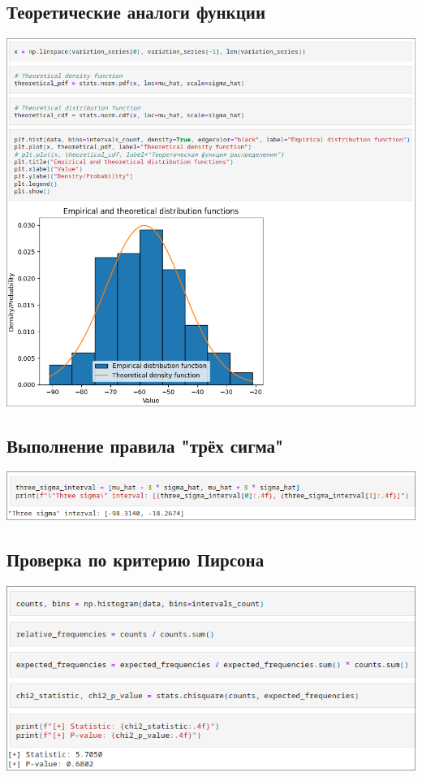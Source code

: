\documentclass[a4paper]{article}
\begin{document}
    \subsection*{Теоретические аналоги функции}
    \includegraphics[width=\textwidth]{images/theoretical_analogs.png}
    
    \subsection*{Выполнение правила "трёх сигма"}
    \includegraphics[width=\textwidth]{images/three_sigma.png}

    \subsection*{Проверка по критерию Пирсона}
    \includegraphics[width=\textwidth]{images/pearson.png}
\end{document}
